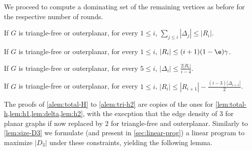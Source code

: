 We proceed to compute a dominating set of the remaining vertices
as before for the respective number of rounds.

\setcounter{lemma}{12} %


\begin{alemma}\label{alem:total-H}
  If $G$ is triangle-free or outerplanar,
  for every $1\le i$, $\sum\limits_{j\le i}|\Delta_j| \le |R_i|$.
\end{alemma}

\begin{alemma}\label{alem:tri-h1}
  If $G$ is triangle-free or outerplanar,
  for every $1\le i$, $|R_i| \le (i+1)(1-\e)\gamma$.
\end{alemma}

\begin{alemma}\label{alem:tri-delta}
  If $G$ is triangle-free or outerplanar,
  for every $5\le i$, $|\Delta_i| \le \frac{2|R_i|}{i-4}$.
\end{alemma}

\begin{alemma}\label{alem:tri-h2}
  If $G$ is triangle-free or outerplanar,
  for every $1\le i$, $|R_i| \le |R_{i+1}| - \frac{(i-3)|\Delta_{i+1}|}{2}$.
\end{alemma}

The proofs of \cref{alem:total-H} to \ref{alem:tri-h2} are copies of the ones
for \cref{lem:total-h,lem:h1,lem:delta,lem:h2}, with the execption that the edge
density of $3$ for planar graphs if now replaced by $2$ for triangle-free and
outerplanar.
%
Similarly to \cref{lem:size-D3} we formulate (and present in
\cref{sec:linear-prog}) a linear program to maximize $|D_3|$ under these
constraints, yielding the following lemma.


